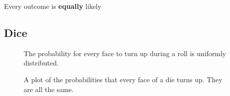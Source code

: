 \documentclass[
  a4paper,
]{scrbook}
\begin{document}
Every outcome is \textbf{equally} likely

\subsection{Dice}\label{dice}

\begin{figure}[ht]


\caption{\label{fig-unif-die}The probability for every face to turn up
during a roll is uniformly distributed.}

\end{figure}%

\begin{figure}[ht]


\caption{\label{fig-unif-pmf}A plot of the probabilities that every face
of a die turns up. They are all the same.}

\end{figure}%
\end{document}
